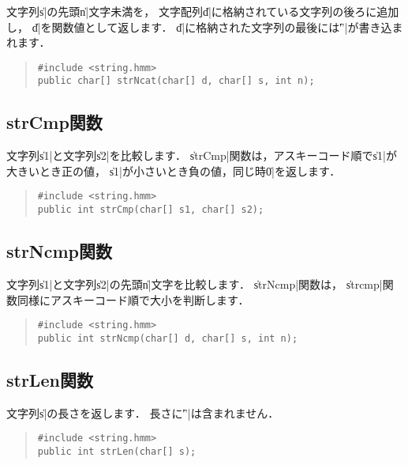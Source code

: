 文字列\|s|の先頭\|n|文字未満を，
文字配列\|d|に格納されている文字列の後ろに追加し，
\|d|を関数値として返します．
\|d|に格納された文字列の最後には\|'\0'|が書き込まれます．

\begin{quote}
\begin{verbatim}
#include <string.hmm>
public char[] strNcat(char[] d, char[] s, int n);
\end{verbatim}
\end{quote}

\subsection{strCmp関数}

文字列\|s1|と文字列\|s2|を比較します．
\|strCmp|関数は，アスキーコード順で\|s1|が大きいとき正の値，
\|s1|が小さいとき負の値，同じ時\|0|を返します．

\begin{quote}
\begin{verbatim}
#include <string.hmm>
public int strCmp(char[] s1, char[] s2);
\end{verbatim}
\end{quote}

\subsection{strNcmp関数}

文字列\|s1|と文字列\|s2|の先頭\|n|文字を比較します．
\|strNcmp|関数は，
\|strcmp|関数同様にアスキーコード順で大小を判断します．

\begin{quote}
\begin{verbatim}
#include <string.hmm>
public int strNcmp(char[] d, char[] s, int n);
\end{verbatim}
\end{quote}

\subsection{strLen関数}

文字列\|s|の長さを返します．
長さに\|'\0'|は含まれません．

\begin{quote}
\begin{verbatim}
#include <string.hmm>
public int strLen(char[] s);
\end{verbatim}
\end{quote}

